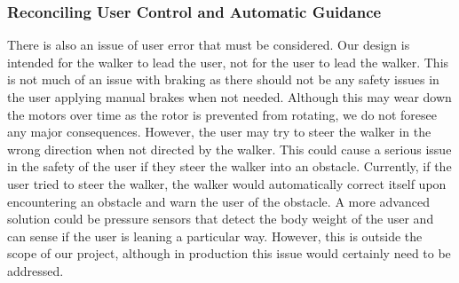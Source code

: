 \subsubsection{Reconciling User Control and Automatic Guidance}
\noindent There is also an issue of user error that must be considered. Our design is intended for the walker to lead the user, not for the user to lead the walker. This is not much of an issue with braking as there should not be any safety issues in the user applying manual brakes when not needed. Although this may wear down the motors over time as the rotor is prevented from rotating, we do not foresee any major consequences. However, the user may try to steer the walker in the wrong direction when not directed by the walker. This could cause a serious issue in the safety of the user if they steer the walker into an obstacle. Currently, if the user tried to steer the walker, the walker would automatically correct itself upon encountering an obstacle and warn the user of the obstacle. A more advanced solution could be pressure sensors that detect the body weight of the user and can sense if the user is leaning a particular way. However, this is outside the scope of our project, although in production this issue would certainly need to be addressed.\\ 

